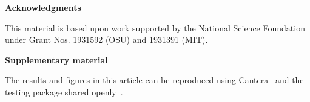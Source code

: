 \documentclass[twocolumn,10pt]{article} %
\renewcommand{\section}%
              [1]%
              {%
               \bgroup%
               \flushleft%
               \small\bf%
               \stepcounter{section}%
               \arabic{section}. #1%
               \par%
               \egroup%
              }%
\newcommand{\acknowledgement}%
              [1]%
              {%
               \bgroup%
               \flushleft%
               \small\bf%
               #1%
               \par%
               \egroup%
              }%
\newcommand{\sectionOne}[1]{\section{#1} \addvspace{10pt}}
\begin{document}

\acknowledgement{Acknowledgments} \addvspace{10pt}

This material is based upon work supported by the National Science Foundation under Grant Nos. 1931592 (OSU) and 1931391 (MIT).


\acknowledgement{Supplementary material} \addvspace{10pt}

The results and figures in this article can be reproduced using Cantera~\cite{cantera} and the testing package shared openly~\cite{testing_package}.

 \footnotesize
 \baselineskip 9pt






\newpage

\small
\baselineskip 10pt


\end{document}
